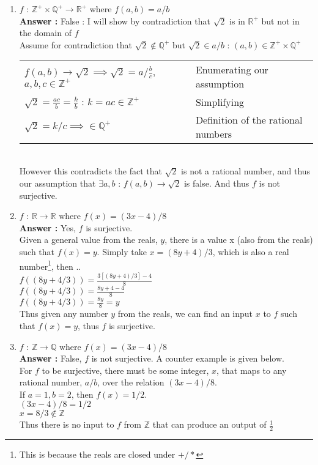\documentclass[a4paper,10pt]{article}
\newcommand{\answer}{\textbf{Answer : }}
\begin{document}
\begin{enumerate}
\begin{enumerate}
    \item $f$ : $\mathbb{Z}^+ \times \mathbb{Q}^+ \to \mathbb{R}^+$ where $f(a, b) = a/b$ \\
    \answer False : I will show by contradiction that $\sqrt{2}$ is in $\mathbb{R}^+$ but not in the domain of $f$ \\[.1in]
    Assume for contradiction that $\sqrt{2} \not \in \mathbb{Q}^+$ but $\sqrt{2} \in a/b$ : $(a, b) \in \mathbb{Z}^+ \times \mathbb{Q}^+$ \\
    \begin{tabular}{l | l}
    $f(a,b) \to \sqrt{2} \implies \sqrt{2} = a/\frac{b}{c}$, $a,b,c \in \mathbb{Z}^+$ & Enumerating our assumption \\
    $\sqrt{2} = \frac{ac}{b} = \frac{k}{b}$ : $k = ac \in \mathbb{Z}^+$ & Simplifying \\
    $\sqrt{2} = k/c \implies \in \mathbb{Q}^+$ & Definition of the rational numbers \\
    \end{tabular} \\
    However this contradicts the fact that $\sqrt{2}$ is not a rational number, and thus our assumption that $\exists a,b $ : $f(a,b) \to \sqrt{2}$ is false. And thus $f$ is not surjective. \\

    \item $f$ : $\mathbb{R} \to \mathbb{R} \text{ where } f(x) = (3x-4)/8$ \\
    \answer Yes, $f$ is surjective. \\
    Given a general value from the reals, $y$, there is a value x (also from the reals) such that $f(x) = y$.
    Simply take $x = (8y+4)/3$, which is also a real number\footnote{This is because the reals are closed under $+/*$}, then .. \\
    $f((8y+4/3)) = \frac{3[(8y+4)/3]-4}{8}$ \\
    $f((8y+4/3)) = \frac{8y+4-4}{8}$ \\
    $f((8y+4/3)) = \frac{8y}{8} = y$ \\
    Thus given any number $y$ from the reals, we can find an input $x$ to $f$ such that $f(x) = y$, thus $f$ is surjective.

    \item $f$ : $\mathbb{Z} \to \mathbb{Q} \text{ where } f(x) = (3x-4)/8$ \\ 
    \answer False, $f$ is not surjective. A counter example is given below. \\
    For $f$ to be surjective, there must be some integer, $x$, that maps to any rational number, $a/b$, over the relation $(3x-4)/8$. \\
    If $a = 1, b = 2$, then $f(x) = 1/2$. \\
    $(3x-4)/8 = 1/2$ \\
    $x = 8/3 \not\in \mathbb{Z}$ \\
    Thus there is no input to $f$ from $\mathbb{Z}$ that can produce an output of $\frac{1}{2}$
    \end{enumerate}



\end{enumerate}
\end{document}
